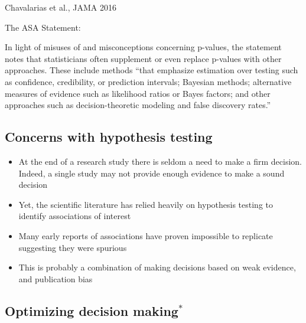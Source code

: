 \documentclass[
]{book}
\providecommand{\tightlist}{%
  \setlength{\itemsep}{0pt}\setlength{\parskip}{0pt}}
\begin{document}
Chavalarias et al., JAMA 2016

The ASA Statement:

In light of misuses of and misconceptions concerning p-values, the statement notes that statisticians often supplement or even replace p-values with other approaches. These include methods ``that emphasize estimation over testing such as confidence, credibility, or prediction intervals; Bayesian methods; alternative measures of evidence such as likelihood ratios or Bayes factors; and other approaches such as decision-theoretic modeling and false discovery rates.''

\hypertarget{concerns-with-hypothesis-testing}{%
\subsection{Concerns with hypothesis testing}\label{concerns-with-hypothesis-testing}}

\begin{itemize}
\tightlist
\item
  At the end of a research study there is seldom a need to make a firm decision. Indeed, a single study may not provide enough evidence to make a sound decision
\item
  Yet, the scientific literature has relied heavily on hypothesis testing to identify associations of interest
\item
  Many early reports of associations have proven impossible to replicate suggesting they were spurious
\item
  This is probably a combination of making decisions based on weak evidence, and publication bias
\end{itemize}

\hypertarget{optimizing-decision-making}{%
\subsection{\texorpdfstring{Optimizing decision making\(^*\)}{Optimizing decision making\^{}*}}\label{optimizing-decision-making}}
\end{document}
